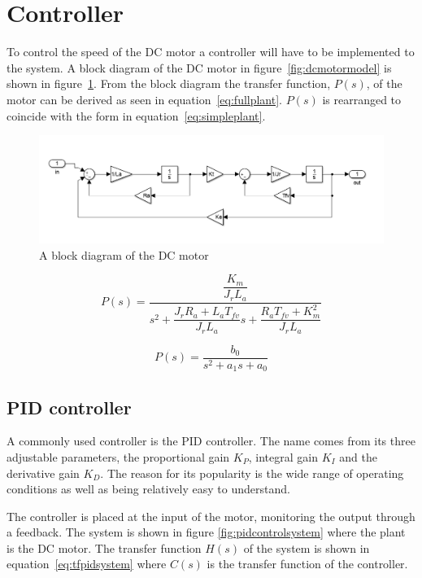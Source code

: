\section{Controller}
\label{sec:controller}


To control the speed of the DC motor a controller will have to be implemented to the system. 
A block diagram of the DC motor in figure~\ref{fig:dcmotormodel} is shown in figure~\ref{fig:dcblock}. 
From the block diagram the transfer function, $P(s)$, of the motor can be derived as seen in equation~\ref{eq:fullplant}.
$P(s)$ is rearranged to coincide with the form in equation~\ref{eq:simpleplant}.

\begin{figure}[!h]
	\centering
	\includegraphics[width=.75\linewidth]{graphics/dcblockdiagram}
	\caption{A block diagram of the DC motor}
	\label{fig:dcblock}
\end{figure}


\begin{equation}
\label{eq:fullplant}
P(s) = \dfrac{\dfrac{K_m}{J_r L_a}}{s^2 + \dfrac{J_r R_a + L_a T_{fv}}{J_r L_a}s + \dfrac{R_a T_{fv} +K_m^2}{J_r L_a}}
\end{equation}

\begin{equation}
\label{eq:simpleplant}
P(s) = \dfrac{b_0}{s^2 + a_1 s + a_0}
\end{equation}


\subsection{PID controller}
 A commonly used controller is the PID controller\cite{feedback}. 
 The name comes from its three adjustable parameters, the proportional gain $K_{P}$, integral gain $K_{I}$ and the derivative gain $K_{D}$. 
 The reason for its popularity is the wide range of operating conditions as well as being relatively easy to understand. 
 
 The controller is placed at the input of the motor, monitoring the output through a feedback. 
 The system is shown in figure \ref{fig:pidcontrolsystem} where the plant is the DC motor. 
 The transfer function $H(s)$ of the system is shown in equation~\ref{eq:tfpidsystem} where $C(s)$ is the transfer function of the controller.


